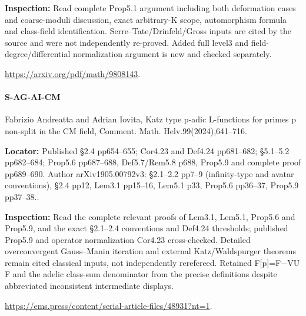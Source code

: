 \documentclass[11pt,a4paper]{article}
\begin{document}
\textbf{Inspection:} Read complete Prop5.\allowbreak{}1 argument including both deformation cases and coarse-moduli discussion, exact arbitrary-K scope, automorphism formula and class-field identification.\allowbreak{} Serre–\allowbreak{}Tate/\allowbreak{}Drinfeld/\allowbreak{}Gross inputs are cited by the source and were not independently re-proved.\allowbreak{} Added full level3 and field-degree/\allowbreak{}differential normalization argument is new and checked separately.\allowbreak{}

\url{https://arxiv.org/pdf/math/9808143}.

\paragraph{S-AG-AI-CM} Fabrizio Andreatta and Adrian Iovita, Katz type p-adic L-functions for primes p non-split in the CM field, Comment.\allowbreak{} Math.\allowbreak{} Helv.\allowbreak{}99(2024),641–\allowbreak{}716.

\textbf{Locator:} Published §2.\allowbreak{}4 pp654–\allowbreak{}655; Cor4.\allowbreak{}23 and Def4.\allowbreak{}24 pp681–\allowbreak{}682; §5.\allowbreak{}1–\allowbreak{}5.\allowbreak{}2 pp682–\allowbreak{}684; Prop5.\allowbreak{}6 pp687–\allowbreak{}688, Def5.\allowbreak{}7/\allowbreak{}Rem5.\allowbreak{}8 p688, Prop5.\allowbreak{}9 and complete proof pp689–\allowbreak{}690.\allowbreak{} Author arXiv1905.\allowbreak{}00792v3:\allowbreak{} §2.\allowbreak{}1–\allowbreak{}2.\allowbreak{}2 pp7–\allowbreak{}9 (infinity-type and avatar conventions), §2.\allowbreak{}4 pp12, Lem3.\allowbreak{}1 pp15–\allowbreak{}16, Lem5.\allowbreak{}1 p33, Prop5.\allowbreak{}6 pp36–\allowbreak{}37, Prop5.\allowbreak{}9 pp37–\allowbreak{}38.\allowbreak{}.

\textbf{Inspection:} Read the complete relevant proofs of Lem3.\allowbreak{}1, Lem5.\allowbreak{}1, Prop5.\allowbreak{}6 and Prop5.\allowbreak{}9, and the exact §2.\allowbreak{}1–\allowbreak{}2.\allowbreak{}4 conventions and Def4.\allowbreak{}24 thresholds; published Prop5.\allowbreak{}9 and operator normalization Cor4.\allowbreak{}23 cross-checked.\allowbreak{} Detailed overconvergent Gauss–\allowbreak{}Manin iteration and external Katz/\allowbreak{}Waldspurger theorems remain cited classical inputs, not independently rerefereed.\allowbreak{} Retained F[p]=F\ensuremath{-}VU F and the adelic class-sum denominator from the precise definitions despite abbreviated inconsistent intermediate displays.\allowbreak{}

\url{https://ems.press/content/serial-article-files/48931?nt=1}.
\end{document}

